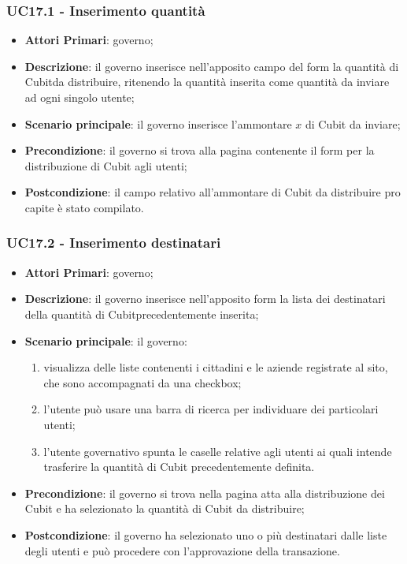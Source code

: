 \subsubsection{UC17.1 - Inserimento quantità}
\begin{itemize}
	\item \textbf{Attori Primari}: governo;
	\item \textbf{Descrizione}: il governo inserisce nell'apposito campo del form la quantità di Cubit\glosp da distribuire, ritenendo la quantità inserita come quantità da inviare ad ogni singolo utente;
	\item \textbf{Scenario principale}: il governo inserisce l'ammontare $x$ di 
	Cubit da inviare;
	\item \textbf{Precondizione}: il governo si trova alla pagina contenente il form per la distribuzione di Cubit agli utenti;
	\item \textbf{Postcondizione}: il campo relativo all'ammontare di Cubit da 
	distribuire pro capite è stato compilato. 
\end{itemize}
\subsubsection{UC17.2 - Inserimento destinatari}
\begin{itemize}
	\item \textbf{Attori Primari}: governo;
	\item \textbf{Descrizione}: il governo inserisce nell'apposito form la lista dei destinatari della quantità di Cubit\glosp precedentemente inserita;
	\item \textbf{Scenario principale}: il governo:
	\begin{enumerate}[label=\alph*.]
		\item visualizza delle liste contenenti i cittadini e le aziende registrate al sito, che sono accompagnati da una checkbox;
		\item l'utente può usare una barra di ricerca per individuare dei particolari utenti;
		\item l'utente governativo spunta le caselle relative agli utenti ai quali intende trasferire la quantità di Cubit precedentemente definita.
	\end{enumerate}
	\item \textbf{Precondizione}: il governo si trova nella pagina atta alla distribuzione dei Cubit e ha selezionato la quantità di Cubit da distribuire;
	\item \textbf{Postcondizione}: il governo ha selezionato uno o più destinatari dalle liste degli utenti e può procedere con l'approvazione della transazione.
\end{itemize}
